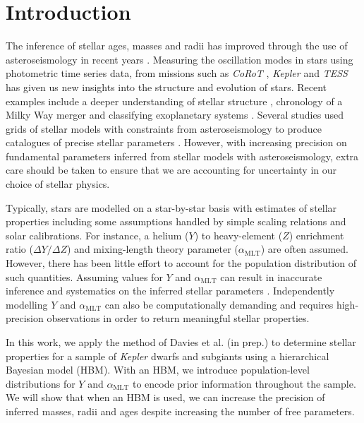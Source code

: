 \documentclass[a4paper,fleqn,usenatbib]{mnras}
\newcommand{\mlt}{\ensuremath{{\alpha_\mathrm{MLT}}}}
\begin{document}


\section{Introduction}

The inference of stellar ages, masses and radii has improved through the use of asteroseismology in recent years \citep[e.g. see the review by][]{Chaplin.Miglio2013}. Measuring the oscillation modes in stars using photometric time series data, from missions such as \emph{CoRoT} \citep{Baglin.Auvergne.ea2006}, \emph{Kepler} \citep{Borucki.Koch.ea2010} and \emph{TESS} \citep{Ricker.Winn.ea2015} has given us new insights into the structure and evolution of stars. Recent examples include a deeper understanding of stellar structure \citep{Verma.Raodeo.ea2017}, chronology of a Milky Way merger \citep{Chaplin.Serenelli.ea2020} and classifying exoplanetary systems \citep{Huber.Chaplin.ea2019}. Several studies used grids of stellar models with constraints from asteroseismology to produce catalogues of precise stellar parameters \citep{Pinsonneault.Elsworth.ea2014, SilvaAguirre.Lund.ea2017}. However, with increasing precision on fundamental parameters inferred from stellar models with asteroseismology, extra care should be taken to ensure that we are accounting for uncertainty in our choice of stellar physics.

Typically, stars are modelled on a star-by-star basis with estimates of stellar properties including some assumptions handled by simple scaling relations and solar calibrations. %
For instance, a helium ($Y$) to heavy-element ($Z$) enrichment ratio ($\Delta Y / \Delta Z$) and mixing-length theory parameter ($\mlt$) are often assumed. However, there has been little effort to account for the population distribution of such quantities. Assuming values for $Y$ and $\mlt$ can result in inaccurate inference and systematics on the inferred stellar parameters \citep{Valle.DellOmodarme.ea2015}. Independently modelling $Y$ and $\mlt$ can also be computationally demanding and requires high-precision observations in order to return meaningful stellar properties.

In this work, we apply the method of Davies et al. (in prep.) to determine stellar properties for a sample of \emph{Kepler} dwarfs and subgiants using a hierarchical Bayesian model (HBM). With an HBM, we introduce population-level distributions for $Y$ and $\mlt$ to encode prior information throughout the sample. We will show that when an HBM is used, we can increase the precision of inferred masses, radii and ages despite increasing the number of free parameters.
\end{document}
